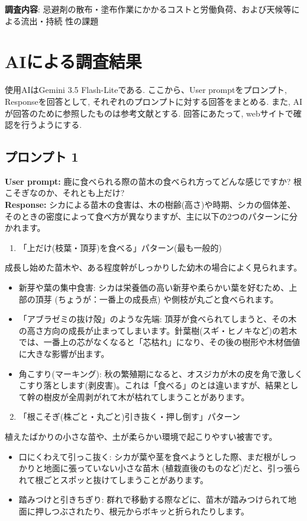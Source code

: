 \documentclass[a4paper, 11pt]{jsarticle}
\begin{document}
\textbf{調査内容}: 忌避剤の散布・塗布作業にかかるコストと労働負荷、および天候等による流出・持続
性の課題
\section{AIによる調査結果}
使用AIはGemini 3.5 Flash-Liteである. ここから、User promptをプロンプト, Responseを回答として, それぞれのプロンプトに対する回答をまとめる. また, AIが回答のために参照したものは参考文献とする. 回答にあたって, webサイトで確認を行うようにする. 

\subsection{プロンプト 1}
\noindent\textbf{User prompt:} 鹿に食べられる際の苗木の食べられ方ってどんな感じですか? 根こそぎなのか、それとも上だけ? \\
\noindent\textbf{Response:} シカによる苗木の食害は、木の樹齢(高さ)や時期、シカの個体差、そのときの密度によって食べ方が異なりますが、主に以下の2つのパターンに分かれます。
\begin{enumerate}
    \item 「上だけ(枝葉・頂芽)を食べる」パターン(最も一般的)
\end{enumerate}
成長し始めた苗木や、ある程度幹がしっかりした幼木の場合によく見られます。
\begin{itemize}
    \item 新芽や葉の集中食害: シカは栄養価の高い新芽や柔らかい葉を好むため、上部の頂芽 (ちょうが：一番上の成長点) や側枝が丸ごと食べられます。
    \item 「アブラゼミの抜け殻」のような先端: 頂芽が食べられてしまうと、その木の高さ方向の成長が止まってしまいます。針葉樹(スギ・ヒノキなど)の若木では、一番上の芯がなくなると「芯枯れ」になり、その後の樹形や木材価値に大きな影響が出ます。
    \item 角こすり(マーキング): 秋の繁殖期になると、オスジカが木の皮を角で激しくこすり落とします(剥皮害)。これは「食べる」のとは違いますが、結果として幹の樹皮が全周剥がれて木が枯れてしまうことがあります。
\end{itemize}
\begin{enumerate}
    \setcounter{enumi}{1}
    \item 「根こそぎ(株ごと・丸ごと)引き抜く・押し倒す」パターン
\end{enumerate}
植えたばかりの小さな苗や、土が柔らかい環境で起こりやすい被害です。
\begin{itemize}
    \item 口にくわえて引っこ抜く: シカが葉や茎を食べようとした際、まだ根がしっかりと地面に張っていない小さな苗木 (植栽直後のものなど)だと、引っ張られて根ごとスポッと抜けてしまうことがあります。
    \item 踏みつけと引きちぎり: 群れで移動する際などに、苗木が踏みつけられて地面に押しつぶされたり、根元からボキッと折られたりします。
\end{itemize}
\end{document}
